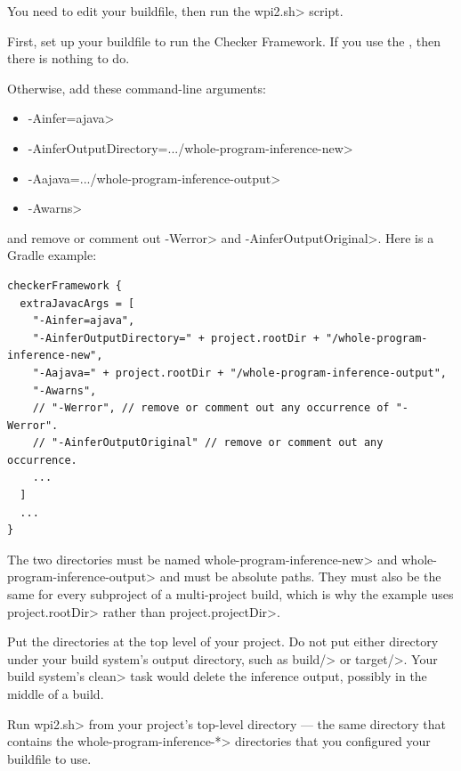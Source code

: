 You need to edit your buildfile, then run the \<wpi2.sh> script.



First, set up your buildfile to run the Checker Framework.
If you use the
, then there is nothing to do.

Otherwise, add these command-line arguments:
\begin{itemize}
\item \<-Ainfer=ajava>
\item \<-AinferOutputDirectory=.../whole-program-inference-new>
\item \<-Aajava=.../whole-program-inference-output>
\item \<-Awarns>
\end{itemize}

\noindent
and remove or comment out \<-Werror> and \<-AinferOutputOriginal>.
Here is a Gradle example:

\begin{Verbatim}
checkerFramework {
  extraJavacArgs = [
    "-Ainfer=ajava",
    "-AinferOutputDirectory=" + project.rootDir + "/whole-program-inference-new",
    "-Aajava=" + project.rootDir + "/whole-program-inference-output",
    "-Awarns",
    // "-Werror", // remove or comment out any occurrence of "-Werror".
    // "-AinferOutputOriginal" // remove or comment out any occurrence.
    ...
  ]
  ...
}
\end{Verbatim}

The two directories must be named \<whole-program-inference-new> and
\<whole-program-inference-output> and must be absolute paths.
They must also be the same for every subproject of a
multi-project build, which is why the example uses \<project.rootDir> rather
than \<project.projectDir>.

Put the directories at the top level of your project.
Do not put either directory under your build system's output directory, such
as \<build/> or \<target/>.  Your build system's \<clean> task would delete
the inference output, possibly in the middle of a build.



Run \<wpi2.sh> from your project's top-level directory --- the same
directory that contains the \<whole-program-inference-*> directories that you
configured your buildfile to use.

